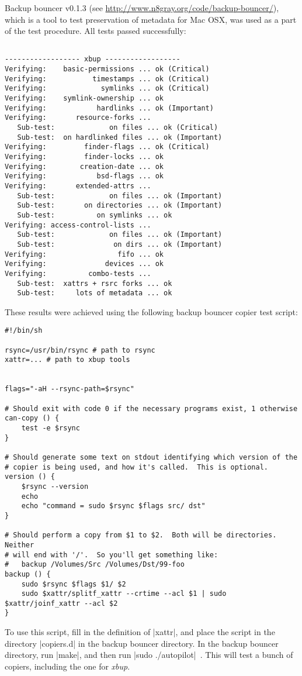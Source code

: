\documentclass[11pt]{article}
\begin{document}
Backup bouncer v0.1.3 
(see \url{http://www.n8gray.org/code/backup-bouncer/}),
which is a tool to test preservation of metadata for Mac OSX,
was used as a part of the test procedure.
All tests passed successfully:
{\small
\begin{Verbatim}

------------------ xbup ------------------
Verifying:    basic-permissions ... ok (Critical)
Verifying:           timestamps ... ok (Critical)
Verifying:             symlinks ... ok (Critical)
Verifying:    symlink-ownership ... ok 
Verifying:            hardlinks ... ok (Important)
Verifying:       resource-forks ... 
   Sub-test:             on files ... ok (Critical)
   Sub-test:  on hardlinked files ... ok (Important)
Verifying:         finder-flags ... ok (Critical)
Verifying:         finder-locks ... ok 
Verifying:        creation-date ... ok 
Verifying:            bsd-flags ... ok 
Verifying:       extended-attrs ... 
   Sub-test:             on files ... ok (Important)
   Sub-test:       on directories ... ok (Important)
   Sub-test:          on symlinks ... ok 
Verifying: access-control-lists ... 
   Sub-test:             on files ... ok (Important)
   Sub-test:              on dirs ... ok (Important)
Verifying:                 fifo ... ok 
Verifying:              devices ... ok 
Verifying:          combo-tests ... 
   Sub-test:  xattrs + rsrc forks ... ok 
   Sub-test:     lots of metadata ... ok 
\end{Verbatim}
}
These results were achieved using the following backup bouncer
copier test script:
{\small
\begin{Verbatim}
#!/bin/sh

rsync=/usr/bin/rsync # path to rsync
xattr=... # path to xbup tools


flags="-aH --rsync-path=$rsync"

# Should exit with code 0 if the necessary programs exist, 1 otherwise
can-copy () {
    test -e $rsync
}

# Should generate some text on stdout identifying which version of the
# copier is being used, and how it's called.  This is optional.
version () {
    $rsync --version
    echo
    echo "command = sudo $rsync $flags src/ dst"
}

# Should perform a copy from $1 to $2.  Both will be directories.  Neither
# will end with '/'.  So you'll get something like:
#   backup /Volumes/Src /Volumes/Dst/99-foo
backup () {
    sudo $rsync $flags $1/ $2
    sudo $xattr/splitf_xattr --crtime --acl $1 | sudo  $xattr/joinf_xattr --acl $2
}
\end{Verbatim}
}
To use this script, fill in the definition of |xattr|, and 
place the script in the directory |copiers.d| in the backup bouncer directory.
In the backup bouncer directory,
run |make|, and then
run |sudo ./autopilot|\ .
This will test a bunch of copiers, including the one for \emph{xbup}.
\end{document}
